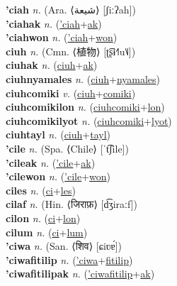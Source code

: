 \textbf{'ciah} \textit{n.} (Ara. ⟨شيعة‎⟩ [ʃiːʔah])
 \label{'ciah} \\
\textbf{'ciahak} \textit{n.} (\hyperref['ciah]{'ciah}+\hyperref[ak]{ak})
 \label{'ciahak} \\
\textbf{'ciahwon} \textit{n.} (\hyperref['ciah]{'ciah}+\hyperref[won]{won})
 \label{'ciahwon} \\
\textbf{ciuh} \textit{n.} (Cmn. ⟨植物⟩ [ʈ͡ʂɨ˧˥u˥˩])
 \label{ciuh} \\
\textbf{ciuhak} \textit{n.} (\hyperref[ciuh]{ciuh}+\hyperref[ak]{ak})
 \label{ciuhak} \\
\textbf{ciuhnyamales} \textit{n.} (\hyperref[ciuh]{ciuh}+\hyperref[nyamales]{nyamales})
 \label{ciuhnyamales} \\
\textbf{ciuhcomiki} \textit{v.} (\hyperref[ciuh]{ciuh}+\hyperref[comiki]{comiki})
 \label{ciuhcomiki} \\
\textbf{ciuhcomikilon} \textit{n.} (\hyperref[ciuhcomiki]{ciuhcomiki}+\hyperref[lon]{lon})
 \label{ciuhcomikilon} \\
\textbf{ciuhcomikilyot} \textit{n.} (\hyperref[ciuhcomiki]{ciuhcomiki}+\hyperref[lyot]{lyot})
 \label{ciuhcomikilyot} \\
\textbf{ciuhtayl} \textit{n.} (\hyperref[ciuh]{ciuh}+\hyperref[tayl]{tayl})
 \label{ciuhtayl} \\
\textbf{'cile} \textit{n.} (Spa. ⟨Chile⟩ [ˈt͡ʃile])
 \label{'cile} \\
\textbf{'cileak} \textit{n.} (\hyperref['cile]{'cile}+\hyperref[ak]{ak})
 \label{'cileak} \\
\textbf{'cilewon} \textit{n.} (\hyperref['cile]{'cile}+\hyperref[won]{won})
 \label{'cilewon} \\
\textbf{ciles} \textit{n.} (\hyperref[ci]{ci}+\hyperref[les]{les})
 \label{ciles} \\
\textbf{cilaf} \textit{n.} (Hin. ⟨जिराफ़⟩ [d͡ʒiraːf])
 \label{cilaf} \\
\textbf{cilon} \textit{n.} (\hyperref[ci]{ci}+\hyperref[lon]{lon})
 \label{cilon} \\
\textbf{cilum} \textit{n.} (\hyperref[ci]{ci}+\hyperref[lum]{lum})
 \label{cilum} \\
\textbf{'ciwa} \textit{n.} (San. ⟨शिव⟩ [ɕiʋɐ́])
 \label{'ciwa} \\
\textbf{'ciwafitilip} \textit{n.} (\hyperref['ciwa]{'ciwa}+\hyperref[fitilip]{fitilip})
 \label{'ciwafitilip} \\
\textbf{'ciwafitilipak} \textit{n.} (\hyperref['ciwafitilip]{'ciwafitilip}+\hyperref[ak]{ak})
 \label{'ciwafitilipak} \\
